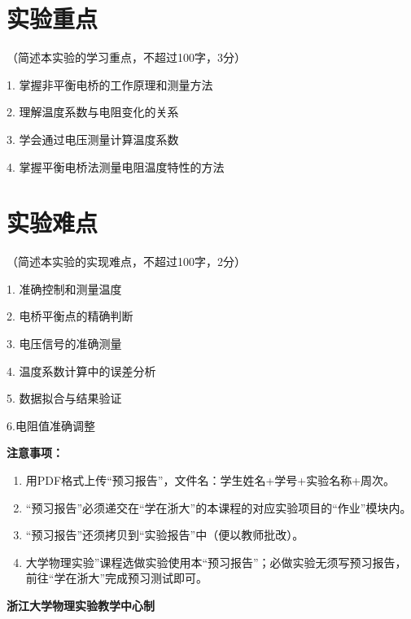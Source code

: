 \documentclass[10pt,a4paper]{ctexart}
\newcommand{\myspace}[1]{\par\vspace{#1\baselineskip}} %
\newcommand{\sihao}{\fontsize{14pt}{18pt}\selectfont}
\newcommand{\xiaosi}{\fontsize{12pt}{16pt}\selectfont}
\begin{document}
    \section{实验重点}
    
    \xiaosi（简述本实验的学习重点，不超过100字，3分）

1. 掌握非平衡电桥的工作原理和测量方法


2. 理解温度系数与电阻变化的关系

3. 学会通过电压测量计算温度系数

4. 掌握平衡电桥法测量电阻温度特性的方法

\myspace{2}
    
    \section{实验难点}

    \xiaosi（简述本实验的实现难点，不超过100字，2分）

1. 准确控制和测量温度

2. 电桥平衡点的精确判断

3. 电压信号的准确测量

4. 温度系数计算中的误差分析

5. 数据拟合与结果验证

6.电阻值准确调整
\myspace{2}


\newpage

\sihao\textbf{注意事项：}
\xiaosi
\begin{enumerate}
    \item 用PDF格式上传“预习报告”，文件名：学生姓名+学号+实验名称+周次。
    \item “预习报告”必须递交在“学在浙大”的本课程的对应实验项目的“作业”模块内。
    \item “预习报告”还须拷贝到“实验报告”中（便以教师批改）。
    \item 大学物理实验”课程选做实验使用本“预习报告”；必做实验无须写预习报告，前往“学在浙大”完成预习测试即可。
\end{enumerate}

\vspace{1cm}
\xiaosi\centering \textbf{浙江大学物理实验教学中心制}
\end{document}
